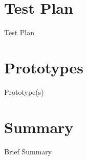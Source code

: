 \documentclass[10pt]{beamer}
\begin{document}
\section{Test Plan}

\begin{frame}{Test Plan}
\end{frame}

\section{Prototypes}

\begin{frame}{Prototype(s)}
\end{frame}

\section{Summary}

\begin{frame}{Brief Summary}
\end{frame}
\end{document}
